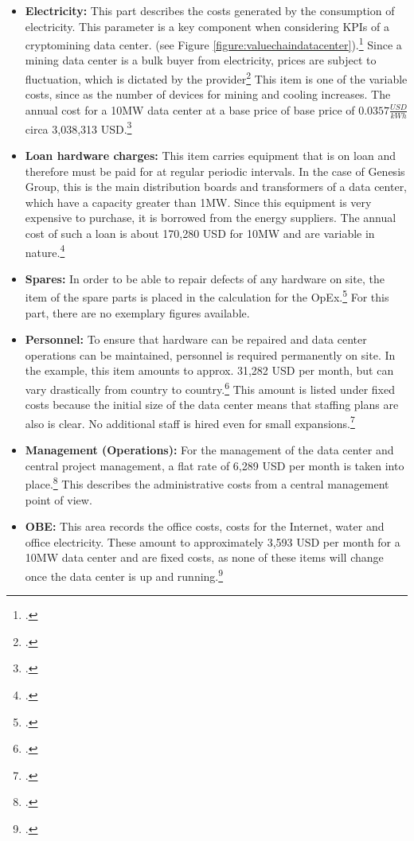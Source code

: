 \begin{itemize}
    \item \textbf{Electricity: }This part describes the costs generated by the consumption of electricity.
    This parameter is a key component when considering \acp{KPI} of a cryptomining data center.
    (see Figure \ref{figure:valuechaindatacenter}).\footcite[Cf.][p. 327]{derks2018chaining} Since a mining data center
    is a bulk buyer from electricity, prices are subject to fluctuation, which is dictated by the provider\footcite[Cf.][]{appendix:opex}
    This item is one of the variable costs, since as the number of devices for mining and cooling increases.
    The annual cost for a 10MW data center at a base price of
    base price of $0.0357 \frac{USD}{kWh}$ circa 3,038,313 USD.\footcite[Cf.][]{appendix:opex}
    \item \textbf{Loan hardware charges: }This item carries equipment that is on loan and therefore must be paid for at regular
    periodic intervals. In the case of Genesis Group, this is the main distribution boards and transformers
    of a data center, which have a capacity greater than 1MW. Since this equipment is very expensive to purchase, it is borrowed from
    the energy suppliers. The annual cost of such a loan is about 170,280 USD for 10MW
    and are variable in nature.\footcite[Cf.][]{appendix:opex}
    \item \textbf{Spares: }In order to be able to repair defects of any hardware on site, the item of the
    spare parts is placed in the calculation for the \ac{OpEx}.\footcite[Cf.][p. 327]{derks2018chaining} For this part, there are
    no exemplary figures available.
    \item \textbf{Personnel: }To ensure that hardware can be repaired and data center operations
    can be maintained, personnel is required permanently on site. In the example, this item amounts to approx.
    31,282 USD per month, but can vary drastically from country to country.\footcite[Cf.][]{appendix:opex}
    This amount is listed under fixed costs because the initial size of the data center means that staffing plans are also
    is clear. No additional staff is hired even for small expansions.\footcite[Cf.][]{appendix:opex}
    \item \textbf{Management (Operations): }For the management of the data center and central project management, a
    flat rate of 6,289 USD per month is taken into place.\footcite[Cf.][]{appendix:opex} This describes
    the administrative costs from a central management point of view.
    \item \textbf{\ac{OBE}: }This area records the office costs, costs for the Internet, water and office electricity.
    These amount to approximately 3,593 USD per month for a 10MW data center and are fixed costs, as none of these items
    will change once the data center is up and running.\footcite[Cf.][]{appendix:opex}
\end{itemize}

